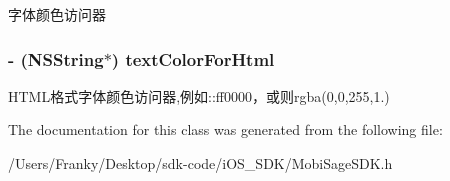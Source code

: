 字体颜色访问器 \hypertarget{interface_mobi_sage_ad_word_banner_ac11e4aa6d2a4b34def7eb414890331c2}{
\subsubsection[{text\-Color\-For\-Html}]{\setlength{\rightskip}{0pt plus 5cm}-\/ (\-N\-S\-String$\ast$) {\bf text\-Color\-For\-Html}}}\label{interface_mobi_sage_ad_word_banner_ac11e4aa6d2a4b34def7eb414890331c2}
\-H\-T\-M\-L格式字体颜色访问器,例如\-::ff0000，或则rgba(0,0,255,1.) 

\-The documentation for this class was generated from the following file\-:\begin{DoxyCompactItemize}
\item 
/\-Users/\-Franky/\-Desktop/sdk-\/code/i\-O\-S\-\_\-\-S\-D\-K/\-Mobi\-Sage\-S\-D\-K.\-h\end{DoxyCompactItemize}
